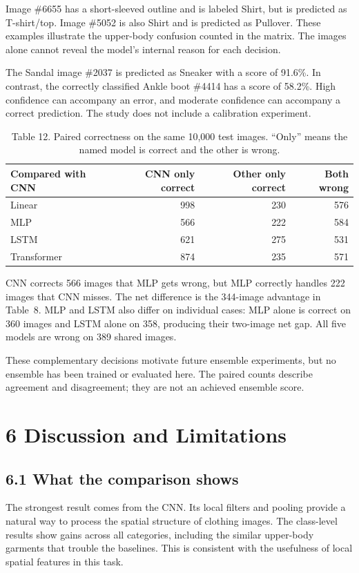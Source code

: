 Image \#6655 has a short-sleeved outline and is labeled Shirt, but is predicted
as T-shirt/top. Image \#5052 is also Shirt and is predicted as Pullover.
These examples illustrate the upper-body confusion counted in the matrix.
The images alone cannot reveal the model's internal reason for each decision.

The Sandal image \#2037 is predicted as Sneaker with a score of 91.6\%.
In contrast, the correctly classified Ankle boot \#4414 has a score of 58.2\%.
High confidence can accompany an error, and moderate confidence can accompany
a correct prediction. The study does not include a calibration experiment.

\begin{table}[H]\centering
\caption{Table 12. Paired correctness on the same 10,000 test images.
``Only'' means the named model is correct and the other is wrong.}
\label{tab:paired}
\begin{tabular}{lrrr}\toprule
Compared with CNN & CNN only correct & Other only correct & Both wrong\\\midrule
Linear & 998 & 230 & 576\\
MLP & 566 & 222 & 584\\
LSTM & 621 & 275 & 531\\
Transformer & 874 & 235 & 571\\

\bottomrule\end{tabular}
\end{table}

CNN corrects 566 images that MLP gets wrong, but MLP correctly handles 222 images
that CNN misses. The net difference is the 344-image advantage in Table~8.
MLP and LSTM also differ on individual cases: MLP alone is correct on
360 images and LSTM alone on 358, producing their two-image net gap.
All five models are wrong on 389 shared images.

These complementary decisions motivate future ensemble experiments, but no
ensemble has been trained or evaluated here. The paired counts describe
agreement and disagreement; they are not an achieved ensemble score.


\section{6 Discussion and Limitations}
\subsection{6.1 What the comparison shows}
The strongest result comes from the CNN. Its local filters and pooling provide
a natural way to process the spatial structure of clothing images.
The class-level results show gains across all categories, including the
similar upper-body garments that trouble the baselines. This is consistent
with the usefulness of local spatial features in this task.

